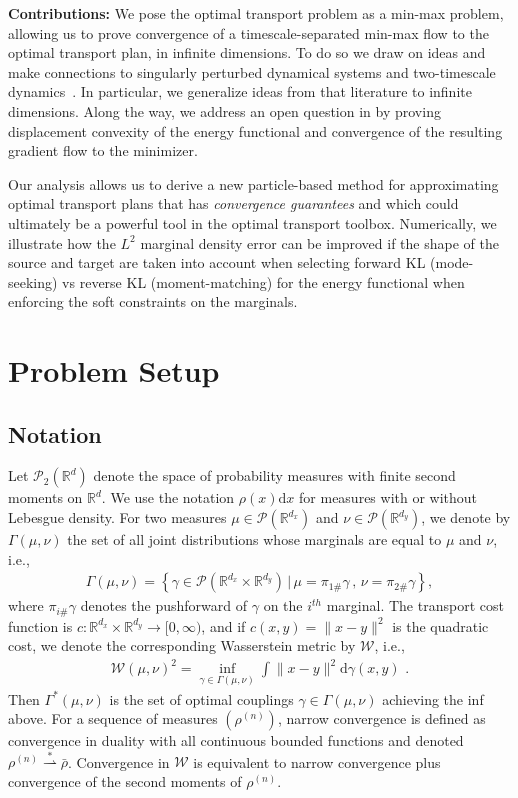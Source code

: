 \documentclass[11pt,a4paper,final]{article}
\def\P{\mathcal P}
\def\R{\mathbb R}
\newcommand{\Wass}{\mathscr{W}}
\renewcommand{\d}{\mathrm{d}}
\newcommand{\1}{\mathbf{1}}
\theoremstyle{plain}
\numberwithin{equation}{section}
\numberwithin{theorem}{section}
\begin{document}
\noindent\textbf{Contributions: }
We pose the optimal transport problem as a min-max problem, allowing us to prove convergence of a timescale-separated  min-max flow to the optimal transport plan, in infinite dimensions. To do so we draw on ideas and make connections to singularly perturbed dynamical systems and two-timescale dynamics~\cite{sastry1999nonlinear}. In particular, we generalize ideas from that literature to infinite dimensions. Along the way, we address an open question in \cite{liu_approximating_2021} by proving displacement convexity of the energy functional and convergence of the resulting gradient flow to the minimizer. 

Our analysis allows us to derive a new particle-based method for approximating optimal transport plans that has \emph{convergence guarantees} and which could ultimately be a powerful tool in the optimal transport toolbox. Numerically, we illustrate how the $L^2$ marginal density error can be improved if the shape of the source and target are taken into account when selecting forward KL (mode-seeking) vs reverse KL (moment-matching) for the energy functional when enforcing the soft constraints on the marginals.



\section{Problem Setup}

\subsection{Notation}
Let $\P_2(\R^d)$ denote the space of probability measures with finite second moments on $\R^d$. We use the notation $\rho(x)\d x$ for measures with or without Lebesgue density. For two measures $\mu\in\P(\R^{d_x})$ and $\nu\in\P(\R^{d_y})$, we denote by $\Gamma(\mu,\nu)$  the set of all joint distributions whose marginals are equal to $\mu$ and $\nu$, i.e.,
\begin{align*}
    \Gamma(\mu,\nu) = \left\{ \gamma\in\P(\R^{d_x} \times \R^{d_y})\, | \, \mu=\pi_{1\#} \gamma\,,\, \nu=\pi_{2\#}\gamma  \right\},
\end{align*}
where $\pi_{i\#}\gamma$ denotes the pushforward of $\gamma$ on the $i^{th}$ marginal.
The transport cost function is $c:
\R^{d_x}\times \R^{d_y}\to[0,\infty)$, and if $c(x,y)=\|x-y\|^2$ is the quadratic cost, we denote the corresponding Wasserstein metric by $\Wass$, i.e.,
\begin{align*}
    \Wass(\mu, \nu)^2 = \inf_{\gamma\in\Gamma(\mu, \nu)} \int \|x-y\|^2 \d \gamma(x,y) \,\,.
\end{align*}
Then $\Gamma^*(\mu, \nu)$ is the set of optimal couplings $\gamma\in\Gamma(\mu, \nu)$ achieving the inf above.
For a sequence of measures $(\rho^{(n)})$, narrow convergence is defined as convergence in duality with all continuous bounded functions and denoted $\rho^{(n)}\overset{*}{\rightharpoonup}\bar \rho$. Convergence in $\Wass$ is equivalent to narrow convergence plus convergence of the second moments of $\rho^{(n)}$.
\end{document}
